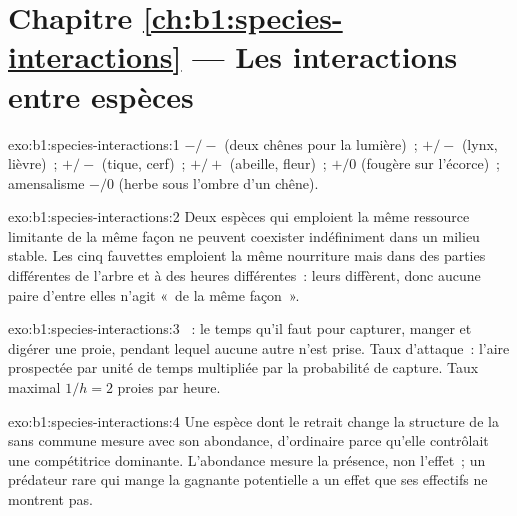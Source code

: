 \section*{Chapitre \ref{ch:b1:species-interactions} --- Les interactions entre espèces}

\begin{solution}{exo:b1:species-interactions:1}
 $-/-$ (deux chênes pour la lumière)~;  $+/-$ (lynx,
lièvre)~;  $+/-$ (tique, cerf)~;  $+/+$ (abeille,
fleur)~;  $+/0$ (fougère sur l'écorce)~; amensalisme $-/0$
(herbe sous l'ombre d'un chêne).
\end{solution}

\begin{solution}{exo:b1:species-interactions:2}
Deux espèces qui emploient la même ressource limitante de la même façon
ne peuvent coexister indéfiniment dans un milieu stable. Les cinq
fauvettes emploient la même nourriture mais dans des parties
différentes de l'arbre et à des heures différentes~: leurs 
diffèrent, donc aucune paire d'entre elles n'agit «~de la même façon~».
\end{solution}

\begin{solution}{exo:b1:species-interactions:3}
~: le temps qu'il faut pour capturer, manger et
digérer une proie, pendant lequel aucune autre n'est prise. Taux
d'attaque~: l'aire prospectée par unité de temps multipliée par la
probabilité de capture. Taux maximal $1/h = 2$ proies par heure.
\end{solution}

\begin{solution}{exo:b1:species-interactions:4}
Une espèce dont le retrait change la structure de la  sans
commune mesure avec son abondance, d'ordinaire parce qu'elle contrôlait
une compétitrice dominante. L'abondance mesure la présence, non
l'effet~; un prédateur rare qui mange la gagnante potentielle a un effet
que ses effectifs ne montrent pas.
\end{solution}

